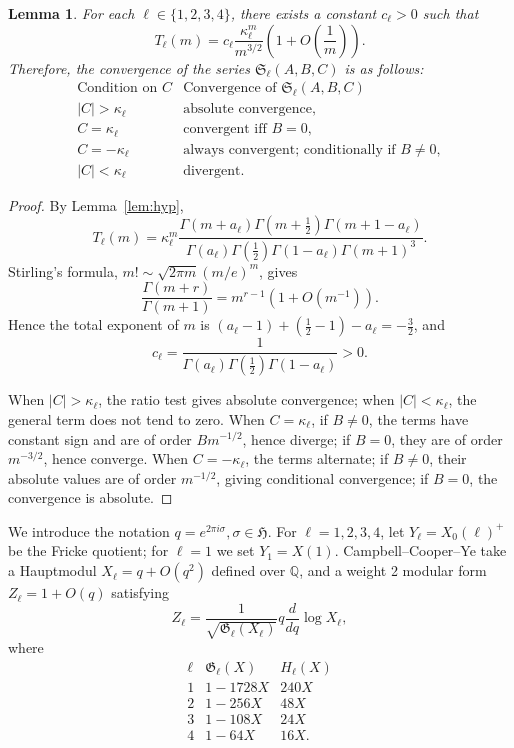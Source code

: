 \documentclass[11pt,a4paper]{amsart} %
\newtheorem{lemma}[theorem]{Lemma}
\theoremstyle{definition}
\newcommand{\Q}{\mathbb Q}
\begin{document}
\begin{lemma}\label{lem:conv}
    For each \(\ell\in\{1,2,3,4\}\), there exists a constant \(c_\ell>0\) such that \[T_\ell(m)=c_\ell\frac{\kappa_\ell^m}{m^{3/2}}\left(1+O\!\left(\frac1m\right)\right).\] Therefore, the convergence of the series \({\mathfrak S}_\ell(A,B,C)\) is as follows: \[\begin{array}{c|c}
\text{Condition on }C & \text{Convergence of }{\mathfrak S}_\ell(A,B,C)\\ \hline
|C|>\kappa_\ell & \text{absolute convergence},\\
C=\kappa_\ell & \text{convergent iff }B=0,\\
C=-\kappa_\ell & \text{always convergent; conditionally if }B\ne0,\\
|C|<\kappa_\ell & \text{divergent}.
\end{array}\]
\end{lemma}
\begin{proof}
By Lemma~\ref{lem:hyp},
\[
T_\ell(m)=\kappa_\ell^m\frac{\Gamma(m+a_\ell)\Gamma(m+\frac12)\Gamma(m+1-a_\ell)}{\Gamma(a_\ell)\Gamma(\frac12)\Gamma(1-a_\ell)\Gamma(m+1)^3}.
\]
Stirling's formula, $m!\sim\sqrt{2\pi m}(m/e)^m$, gives
\[
\frac{\Gamma(m+r)}{\Gamma(m+1)}=m^{r-1}\left(1+O(m^{-1})\right).
\]
Hence the total exponent of $m$ is $(a_\ell-1)+(\frac12-1)-a_\ell=-\frac32$, and
\[
c_\ell=\frac1{\Gamma(a_\ell)\Gamma(\frac12)\Gamma(1-a_\ell)}>0.
\]

When \(|C|>\kappa_\ell\), the ratio test gives absolute convergence; when
\(|C|<\kappa_\ell\), the general term does not tend to zero.
When \(C=\kappa_\ell\), if \(B\ne0\), the terms have constant sign and are of order \(Bm^{-1/2}\), hence diverge; if \(B=0\), they are of order \(m^{-3/2}\), hence converge.
When \(C=-\kappa_\ell\), the terms alternate; if \(B\ne0\), their absolute values are of order \(m^{-1/2}\), giving conditional convergence; if \(B=0\), the convergence is absolute.
\end{proof}

We introduce the notation $q=e^{2\pi i\sigma}, \sigma\in\mathfrak H$. For \(\ell=1,2,3,4\), let $Y_\ell=X_0(\ell)^+$ be the Fricke quotient; for \(\ell=1\) we set \(Y_1=X(1)\). Campbell--Cooper--Ye take a Hauptmodul \(X_\ell=q+O(q^2)\) defined over \(\Q\), and a weight 2 modular form \(Z_\ell=1+O(q)\) satisfying
\[
Z_\ell
=\frac{1}{\sqrt{\mathfrak G_\ell(X_\ell)}}
q\frac{d}{dq}\log X_\ell,
\]
where
\[
\begin{array}{c|c|c}
\ell&\mathfrak G_\ell(X)&H_\ell(X)\\ \hline
1&1-1728X&240X\\
2&1-256X&48X\\
3&1-108X&24X\\
4&1-64X&16X.
\end{array}
\]
\end{document}
